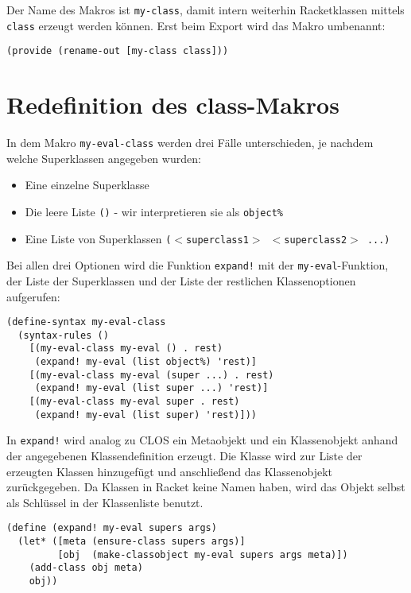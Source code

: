 Der Name des Makros ist \texttt{my-class}, damit intern weiterhin Racketklassen mittels \texttt{class} erzeugt werden können. Erst beim Export wird das Makro umbenannt:

\begin{lstlisting}
(provide (rename-out [my-class class]))
\end{lstlisting}

\section{Redefinition des class-Makros}
\vspace{-0.3cm}
In dem Makro \texttt{my-eval-class} werden drei Fälle unterschieden, je nachdem welche Superklassen angegeben wurden:\vspace{-0.3cm}
\begin{itemize}
 \item Eine einzelne Superklasse \vspace{-0.3cm}
 \item Die leere Liste \texttt{()} - wir interpretieren sie als \texttt{object\%}\vspace{-0.3cm}
 \item Eine Liste von Superklassen \texttt{($<$superclass1$>$ $<$superclass2$>$ ...)}
\end{itemize}

Bei allen drei Optionen wird die Funktion \texttt{expand!} mit der \texttt{my-eval}-Funktion, der Liste der Superklassen und der Liste der restlichen Klassenoptionen aufgerufen:

\begin{lstlisting}
(define-syntax my-eval-class
  (syntax-rules ()
    [(my-eval-class my-eval () . rest) 
     (expand! my-eval (list object%) 'rest)]
    [(my-eval-class my-eval (super ...) . rest)
     (expand! my-eval (list super ...) 'rest)]
    [(my-eval-class my-eval super . rest)
     (expand! my-eval (list super) 'rest)]))
\end{lstlisting}

In \texttt{expand!} wird analog zu CLOS ein Metaobjekt und ein Klassenobjekt anhand der angegebenen Klassendefinition erzeugt. Die Klasse wird zur Liste der erzeugten Klassen hinzugefügt und anschließend das Klassenobjekt zurückgegeben. Da Klassen in Racket  keine Namen haben, wird das Objekt selbst als Schlüssel in der Klassenliste benutzt.

\begin{lstlisting}
(define (expand! my-eval supers args)
  (let* ([meta (ensure-class supers args)]
         [obj  (make-classobject my-eval supers args meta)])
    (add-class obj meta)
    obj))
\end{lstlisting}

